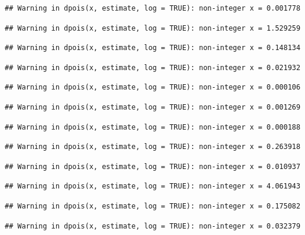 \documentclass[]{article}
\begin{document}
\begin{verbatim}
## Warning in dpois(x, estimate, log = TRUE): non-integer x = 0.001778
\end{verbatim}

\begin{verbatim}
## Warning in dpois(x, estimate, log = TRUE): non-integer x = 1.529259
\end{verbatim}

\begin{verbatim}
## Warning in dpois(x, estimate, log = TRUE): non-integer x = 0.148134
\end{verbatim}

\begin{verbatim}
## Warning in dpois(x, estimate, log = TRUE): non-integer x = 0.021932
\end{verbatim}

\begin{verbatim}
## Warning in dpois(x, estimate, log = TRUE): non-integer x = 0.000106
\end{verbatim}

\begin{verbatim}
## Warning in dpois(x, estimate, log = TRUE): non-integer x = 0.001269
\end{verbatim}

\begin{verbatim}
## Warning in dpois(x, estimate, log = TRUE): non-integer x = 0.000188
\end{verbatim}

\begin{verbatim}
## Warning in dpois(x, estimate, log = TRUE): non-integer x = 0.263918
\end{verbatim}

\begin{verbatim}
## Warning in dpois(x, estimate, log = TRUE): non-integer x = 0.010937
\end{verbatim}

\begin{verbatim}
## Warning in dpois(x, estimate, log = TRUE): non-integer x = 4.061943
\end{verbatim}

\begin{verbatim}
## Warning in dpois(x, estimate, log = TRUE): non-integer x = 0.175082
\end{verbatim}

\begin{verbatim}
## Warning in dpois(x, estimate, log = TRUE): non-integer x = 0.032379
\end{verbatim}
\end{document}
